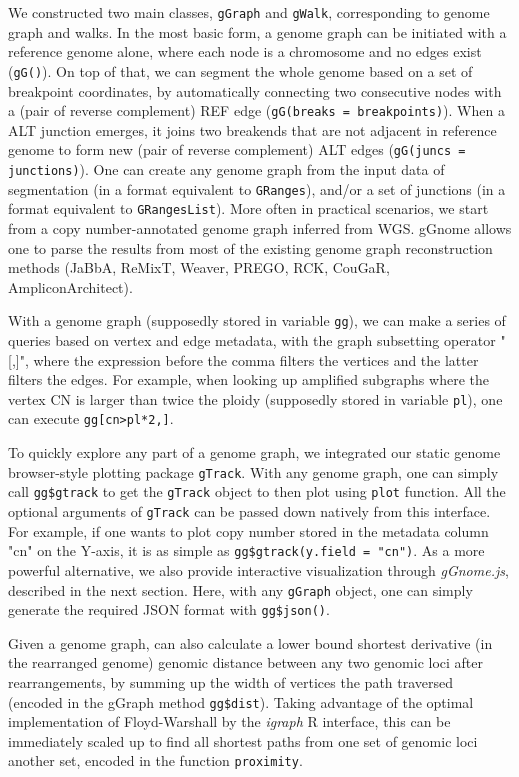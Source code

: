 \documentclass[phd,tocprelim]{cornell}
\begin{document}
We constructed two main classes, \texttt{gGraph} and \texttt{gWalk}, corresponding to genome graph and walks. In the most basic form, a genome graph can be initiated with a reference genome alone, where each node is a chromosome and no edges exist (\texttt{gG()}). On top of that, we can segment the whole genome based on a set of breakpoint coordinates, by automatically connecting two consecutive nodes with a (pair of reverse complement) REF edge (\texttt{gG(breaks = breakpoints)}). When a ALT junction emerges, it joins two breakends that are not adjacent in reference genome to form new (pair of reverse complement) ALT edges (\texttt{gG(juncs = junctions)}). One can create any genome graph from the input data of segmentation (in a format equivalent to \texttt{GRanges}), and/or a set of junctions (in a format equivalent to \texttt{GRangesList}). More often in practical scenarios, we start from a copy number-annotated genome graph inferred from WGS. gGnome allows one to parse the results from most of the existing genome graph reconstruction methods (JaBbA, ReMixT, Weaver, PREGO, RCK, CouGaR, AmpliconArchitect).

With a genome graph (supposedly stored in variable \texttt{gg}), we can make a series of queries based on vertex and edge metadata, with the graph subsetting operator "[,]", where the expression before the comma filters the vertices and the latter filters the edges. For example, when looking up amplified subgraphs where the vertex CN is larger than twice the ploidy (supposedly stored in variable \texttt{pl}), one can execute \texttt{gg[cn>pl*2,]}. 

To quickly explore any part of a genome graph, we integrated our static genome browser-style plotting package \texttt{gTrack}. With any genome graph, one can simply call \texttt{gg\$gtrack} to get the \texttt{gTrack} object to then plot using \texttt{plot} function. All the optional arguments of \texttt{gTrack} can be passed down natively from this interface. For example, if one wants to plot copy number stored in the metadata column "cn" on the Y-axis, it is as simple as \texttt{gg\$gtrack(y.field = "cn")}. As a more powerful alternative, we also provide interactive visualization through \textit{gGnome.js}, described in the next section. Here, with any \texttt{gGraph} object, one can simply generate the required JSON format with \texttt{gg\$json()}.

Given a genome graph, can also calculate a lower bound  shortest derivative (in the rearranged genome) genomic distance between any two genomic loci after rearrangements, by summing up the width of vertices the path traversed (encoded in the gGraph method \texttt{gg\$dist}). Taking advantage of the optimal implementation of Floyd-Warshall by the \textit{igraph} R interface, this can be immediately scaled up to find all shortest paths from one set of genomic loci another set, encoded in the function \texttt{proximity}.
\end{document}
